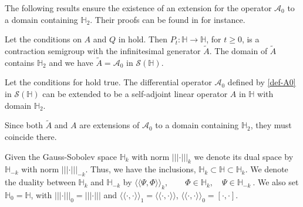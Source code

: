 \documentclass[review,onefignum,onetabnum]{siamart190516}
\begin{document}
The following results ensure the existence of an extension for the operator
$\mathcal{A}_0$ to a domain containing $\mathbb{H}_{2}$. Their
proofs can be found in \cite{liu} for instance.

\begin{theorem}\label{the-Pt-A}
    Let the conditions on $A$ and $Q$ in  hold.
    Then \sloppy ${P_t: \mathbb{H}\rightarrow \mathbb{H}}$, for $t \ge 0$, is a
    contraction semigroup with the infinitesimal generator $\tilde{A}$.
    The domain of $\tilde{A}$ contains $\mathbb{H}_{2}$ and we have
    $\tilde{A} =\mathcal{A}_0 $ in $\mathcal{S}(\mathbb{H})$.

\end{theorem}

\begin{theorem}\label{the-Pt-A1}
    Let the conditions for  hold true. The differential
    operator $\mathcal{A}_0 $  defined by \eqref{def-A0} in
    $\mathcal{S}(\mathbb{H})$ can be extended to be a self-adjoint
    linear operator $A$ in $\mathbb{H}$ with domain $\mathbb{H}_{2}$.

\end{theorem}
%
    Since both $\tilde{A}$ and $A$ are extensions of $\mathcal{A}_0 $ to a
    domain containing $\mathbb{H}_{2}$, they must coincide there.

    Given the Gauss-Sobolev space $\mathbb{H}_{k}$ with norm
$|||\cdot|||_{k} $ we denote its dual space by $\mathbb{H}_{-k}$ with norm
$|||\cdot|||_{-k}$. Thus, we have the inclusions,
$
    \mathbb{H}_{k} \subset \mathbb{H} \subset \mathbb{H}_{k}.
$
We denote the duality between $ \mathbb{H}_{k}$ and $ \mathbb{H}_{-k}$ by
$
    \langle
        \langle
            \Psi,\Phi
        \rangle
    \rangle_k,
    \qquad
    \Phi\in\mathbb{H}_{k},
    \quad \Psi\in\mathbb{H}_{-k} \ .
$
We also set $\mathbb{H}_{0}= \mathbb{H}$,
with $|||\cdot|||_{0}= |||\cdot|||$ and
$
    \langle
        \langle
            \cdot,\cdot
        \rangle
    \rangle_1=
    \langle
        \langle
            \cdot,\cdot
        \rangle
    \rangle
$,
$
    \langle
        \langle
            \cdot,\cdot
        \rangle
    \rangle_0 = [\cdot,\cdot]
$.
\end{document}
